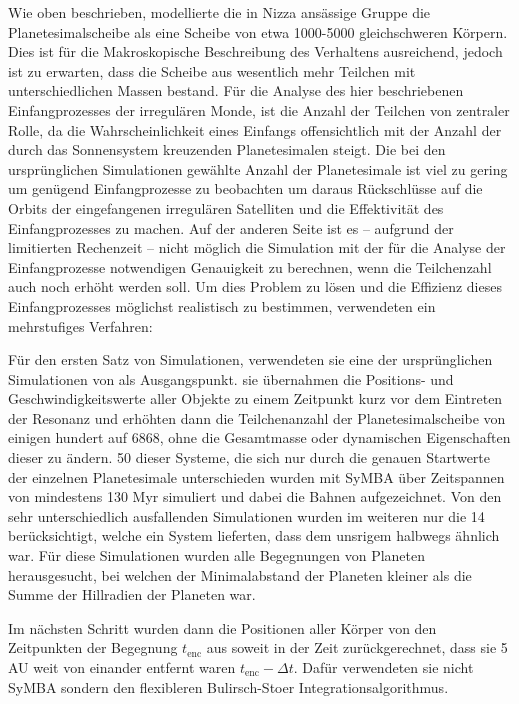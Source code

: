 \documentclass[12pt,a4paper,twoside]{article}
\renewcommand{\cite}{\citep}
\begin{document}
Wie oben beschrieben, modellierte die in Nizza ansässige Gruppe die Planetesimalscheibe als eine Scheibe von etwa 1000-5000 gleichschweren Körpern. Dies ist für die Makroskopische Beschreibung des Verhaltens ausreichend, jedoch ist zu erwarten, dass die Scheibe aus wesentlich mehr Teilchen mit unterschiedlichen Massen bestand.
Für die Analyse des hier beschriebenen Einfangprozesses der irregulären Monde, ist die Anzahl der Teilchen von zentraler Rolle, da die Wahrscheinlichkeit eines Einfangs offensichtlich mit der Anzahl der durch das Sonnensystem kreuzenden Planetesimalen steigt.
Die bei den ursprünglichen Simulationen gewählte Anzahl der Planetesimale ist viel zu gering um genügend Einfangprozesse zu beobachten um daraus Rückschlüsse auf die Orbits der eingefangenen irregulären Satelliten und die Effektivität des Einfangprozesses zu machen.
Auf der anderen Seite ist es -- aufgrund der limitierten Rechenzeit -- nicht möglich die Simulation mit der für die Analyse der Einfangprozesse notwendigen Genauigkeit zu berechnen, wenn die Teilchenzahl auch noch erhöht werden soll.
Um dies Problem zu lösen und die Effizienz dieses Einfangprozesses möglichst realistisch zu bestimmen, verwendeten \cite{Nesvorny2007} ein mehrstufiges Verfahren:

Für den ersten Satz von Simulationen, verwendeten sie eine der ursprünglichen Simulationen von \cite{Gomes2005} als Ausgangspunkt.
sie übernahmen die Positions- und Geschwindigkeitswerte aller Objekte zu einem Zeitpunkt kurz vor dem Eintreten der Resonanz und erhöhten dann die Teilchenanzahl der Planetesimalscheibe von einigen hundert auf 6868, %
ohne die Gesamtmasse oder dynamischen Eigenschaften dieser zu ändern. 50 dieser Systeme, die sich nur durch die genauen Startwerte der einzelnen Planetesimale unterschieden wurden mit SyMBA über Zeitspannen von mindestens 130 Myr simuliert und dabei die Bahnen aufgezeichnet.
Von den sehr unterschiedlich ausfallenden Simulationen wurden im weiteren nur die 14 berücksichtigt, welche ein System lieferten, dass dem unsrigem halbwegs ähnlich war\cite{Nesvorny2007}. %
Für diese Simulationen wurden alle Begegnungen von Planeten herausgesucht, bei welchen der Minimalabstand der Planeten kleiner als die Summe der Hillradien der Planeten war. %

Im nächsten Schritt wurden dann die Positionen aller Körper von den Zeitpunkten der Begegnung $t_{\mathrm{enc}}$ aus soweit in der Zeit zurückgerechnet, dass sie 5 AU weit von einander entfernt waren  $t_{\mathrm{enc}} - \Delta t$\cite{Nesvorny2007}.
Dafür verwendeten sie nicht SyMBA sondern den flexibleren Bulirsch-Stoer Integrationsalgorithmus. %
\end{document}
